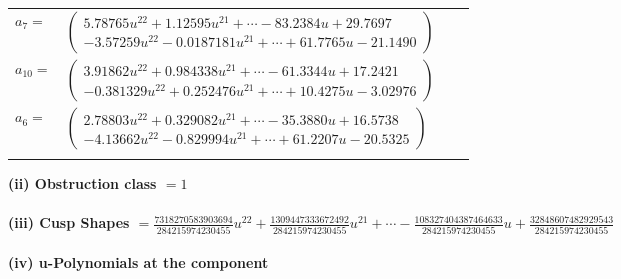 \documentclass[1p]{elsarticle_modified}
\theoremstyle{definition}
\begin{document}
\begin{tabular}{m{7pt} m{180pt} m{7pt} m{180pt} }
\flushright $a_{7}=$&$\begin{pmatrix}5.78765 u^{22}+1.12595 u^{21}+\cdots-83.2384 u+29.7697\\-3.57259 u^{22}-0.0187181 u^{21}+\cdots+61.7765 u-21.1490\end{pmatrix}$ \\
\flushright $a_{10}=$&$\begin{pmatrix}3.91862 u^{22}+0.984338 u^{21}+\cdots-61.3344 u+17.2421\\-0.381329 u^{22}+0.252476 u^{21}+\cdots+10.4275 u-3.02976\end{pmatrix}$ \\
\flushright $a_{6}=$&$\begin{pmatrix}2.78803 u^{22}+0.329082 u^{21}+\cdots-35.3880 u+16.5738\\-4.13662 u^{22}-0.829994 u^{21}+\cdots+61.2207 u-20.5325\end{pmatrix}$\\&\end{tabular}
\flushleft \textbf{(ii) Obstruction class $= 1$}\\~\\
\flushleft \textbf{(iii) Cusp Shapes $= \frac{7318270583903694}{284215974230455} u^{22}+\frac{1309447333672492}{284215974230455} u^{21}+\cdots-\frac{108327404387464633}{284215974230455} u+\frac{32848607482929543}{284215974230455}$}\\~\\
\newpage\renewcommand{\arraystretch}{1}
\flushleft \textbf{(iv) u-Polynomials at the component}\newline \\
\end{document}
